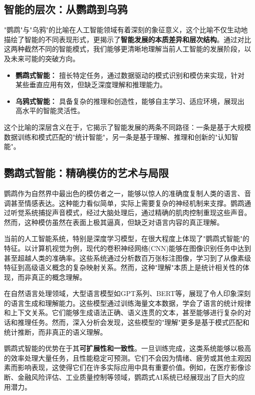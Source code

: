 \subsection*{智能的层次：从鹦鹉到乌鸦}

"鹦鹉"与"乌鸦"的比喻在人工智能领域有着深刻的象征意义，这个比喻不仅生动地描绘了智能的不同表现形式，更揭示了{\bf 智能发展的本质差异和层次结构}。通过对比这两种截然不同的智能模式，我们能够更清晰地理解当前人工智能的发展阶段，以及未来可能的突破方向。

\begin{itemize}
\item {\bf 鹦鹉式智能：} 擅长特定任务，通过数据驱动的模式识别和模仿来实现，针对某些垂直应用有效，但缺乏深度理解和推理能力。
\item {\bf 乌鸦式智能：} 具备复杂的推理和创造性，能够自主学习、适应环境，展现出高水平的智能灵活性。
\end{itemize}

这个比喻的深层含义在于，它揭示了智能发展的两条不同路径：一条是基于大规模数据训练和模式匹配的"统计智能"，另一条是基于理解、推理和创新的"认知智能"。

\subsection*{鹦鹉式智能：精确模仿的艺术与局限}

鹦鹉作为自然界中最出色的模仿者之一，能够以惊人的准确度复制人类的语言、音调甚至情感表达。这种能力看似简单，实际上需要复杂的神经机制来支撑。鹦鹉通过听觉系统捕捉声音模式，经过大脑处理后，通过精确的肌肉控制重现这些声音。然而，这种模仿虽然在表面上极其逼真，但缺乏对语言内容的真正理解。

当前的人工智能系统，特别是深度学习模型，在很大程度上体现了"鹦鹉式智能"的特征。以计算机视觉为例，现代的卷积神经网络(CNN)能够在图像识别任务中达到甚至超越人类的准确率。这些系统通过分析数百万张标注图像，学习到了从像素级特征到高级语义概念的复杂映射关系。然而，这种"理解"本质上是统计相关性的体现，而非真正的概念理解。

在自然语言处理领域，大型语言模型如GPT系列、BERT等，展现了令人印象深刻的语言生成和理解能力。这些模型通过训练海量文本数据，学会了语言的统计规律和上下文关系。它们能够生成语法正确、语义连贯的文本，甚至能够进行复杂的对话和推理任务。然而，深入分析会发现，这些模型的"理解"更多是基于模式匹配和统计推断，而非真正的语义理解。

鹦鹉式智能的优势在于其{\bf 可扩展性和一致性}。一旦训练完成，这类系统能够以极高的效率处理大量任务，且性能稳定可预测。它们不会因为情绪、疲劳或其他主观因素而影响表现，这使得它们在许多实际应用中具有重要价值。例如，在医疗影像诊断、金融风险评估、工业质量控制等领域，鹦鹉式AI系统已经展现出了巨大的应用潜力。

